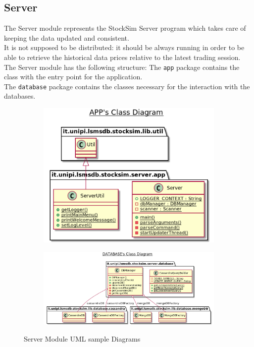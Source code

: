 \subsection{Server}
The Server module represents the StockSim Server program which takes care of
keeping the data updated and consistent.\\
It is not supposed to be distributed: it should be always running in order to be
able to retrieve the historical data prices relative to the latest trading
session.\\
The Server module has the following structure:
\vspace{0.2cm}
\vspace{0.2cm}
\noindent The \texttt{app} package contains the class with the entry point for
the application.\\
The \texttt{database} package contains the classes necessary for the interaction
with the databases.
\begin{figure}[H]
\begin{subfigure}{.5\textwidth}
  \hspace{-2.0cm}
  \includegraphics[scale=0.2]{plantuml/server/app.png}
\end{subfigure}%
\hspace{-2.0cm}
\begin{subfigure}{.5\textwidth}
  \includegraphics[scale=0.2]{plantuml/server/database.png}
\end{subfigure}
\caption{Server Module UML sample Diagrams}
\end{figure}
